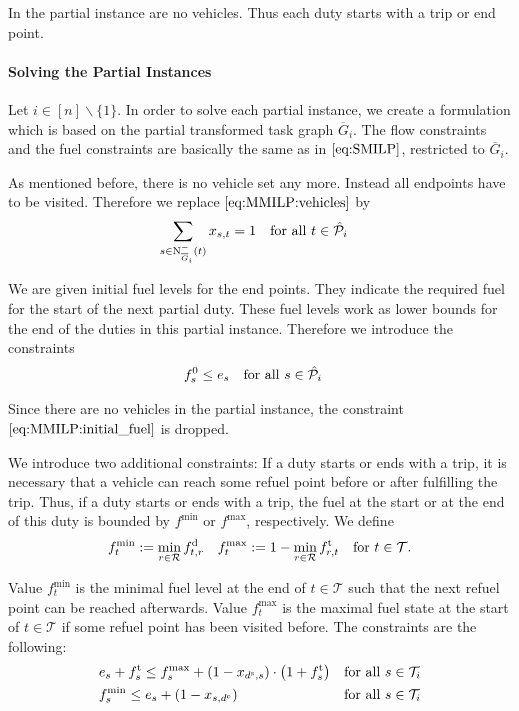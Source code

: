In the partial instance are no vehicles. Thus each duty starts with a trip or end point.

\paragraph{Solving the Partial Instances} \parfill

Let ${i\in[n]\backslash\{1\}}$. In order to solve each partial instance, we create a formulation which is based on the partial transformed task graph $\overline{G}_i$. The flow constraints and the fuel constraints are basically the same as in $\eqref{eq:SMILP}$, restricted to $\overline{G}_i$. 

As mentioned before, there is no vehicle set any more. Instead all endpoints have to be visited. Therefore we replace $\eqref{eq:MMILP:vehicles}$ by
\begin{align}
	& \sum_{s\in\operatorname{N}_{\overline{G}_i}^-(t)} x_{s,t} = 1 && \text{for all } t\in\hat{\mathcal{P}}_i \label{eq:CMILP:start_end_points}
\end{align}

We are given initial fuel levels for the end points. They indicate the required fuel for the start of the next partial duty. These fuel levels work as lower bounds for the end of the duties in this partial instance. Therefore we introduce the constraints
\begin{align}
	& f^0_s \leq e_s && \text{for all } s\in\hat{\mathcal{P}}_i \label{eq:CMILP:final_fuel}
\end{align}

Since there are no vehicles in the partial instance, the constraint $\eqref{eq:MMILP:initial_fuel}$ is dropped.

We introduce two additional constraints: If a duty starts or ends with a trip, it is necessary that a vehicle can reach some refuel point before or after fulfilling the trip. Thus, if a duty starts or ends with a trip, the fuel at the start or at the end of this duty is bounded by $f^{\min}$ or $f^{\max}$, respectively. We define
\begin{align*}
	f^{\min}_t := \min_{r\in\mathcal{R}}f^{\operatorname{d}}_{t,r} && f^{\max}_t := 1 - \min_{r\in\mathcal{R}}f^{\operatorname{t}}_{r,t} && \text{for } t\in\mathcal{T}.
\end{align*}

Value $f^{\min}_t$ is the minimal fuel level at the end of ${t\in\mathcal{T}}$ such that the next refuel point can be reached afterwards. Value $f^{\max}_t$ is the maximal fuel state at the start of ${t\in\mathcal{T}}$ if some refuel point has been visited before. The constraints are the following:
\begin{align}
	& e_s + f^{\operatorname{t}}_s \leq f^{\max}_s + \left(1-x_{d^{\operatorname{s}},s}\right)\cdot\left(1+f^{\operatorname{t}}_s\right) && \text{for all } s\in\mathcal{T}_i \label{eq:CMILP:fmax} \\
	& f^{\min}_s \leq e_s + \left(1-x_{s,d^{\operatorname{e}}}\right) && \text{for all } s\in\mathcal{T}_i \label{eq:CMILP:fmin}
\end{align}

